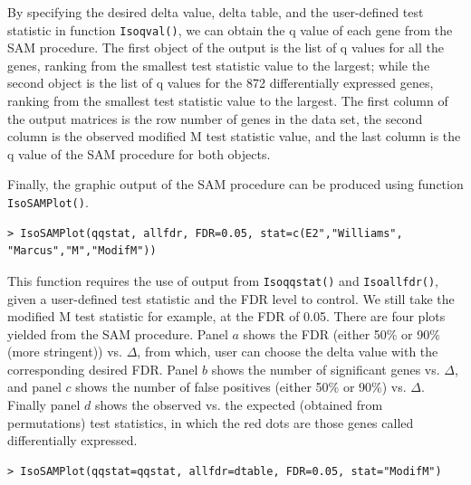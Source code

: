 By specifying the desired delta value, delta table, and the user-defined test statistic in function \texttt{Isoqval()}, we can obtain
the q value of each gene from the SAM procedure. The first object of the output is the list of q values for
all the genes, ranking from the smallest test statistic value to the largest; while the second object is the list of q values
for the 872 differentially expressed genes, ranking from the smallest test statistic value to the largest. The first column of the output matrices is the row number of genes in 
the data set, the second column is the observed modified M test statistic value, and the last column is the q value of the 
SAM procedure for both objects.   

Finally, the graphic output of the SAM procedure can be produced using function \texttt{IsoSAMPlot()}. 
\begin{center}
\begin{boxit}
\begin{verbatim}
> IsoSAMPlot(qqstat, allfdr, FDR=0.05, stat=c(E2","Williams",
"Marcus","M","ModifM"))
\end{verbatim}
\end{boxit}
\end{center}

This function requires the use of output from \texttt{Isoqqstat()} and \texttt{Isoallfdr()}, given a user-defined test statistic
and the FDR level to control. We still take the modified M test statistic for example, at the FDR of 0.05. There are four plots 
yielded from the SAM procedure. Panel $a$ shows the FDR (either 50\% or 90\% (more stringent)) vs. $\Delta$, from which, user can choose the delta value with 
the corresponding desired FDR. Panel $b$ shows the number of significant genes vs. $\Delta$, and panel $c$ shows the number of false positives (either 50\% or 90\%) vs. $\Delta$. Finally panel $d$ shows the observed vs. the expected (obtained from permutations) test statistics, in which the red dots are those genes called differentially expressed.
\begin{center}
\begin{boxit}
\begin{verbatim}
> IsoSAMPlot(qqstat=qqstat, allfdr=dtable, FDR=0.05, stat="ModifM")
\end{verbatim}
\end{boxit}
\end{center}

